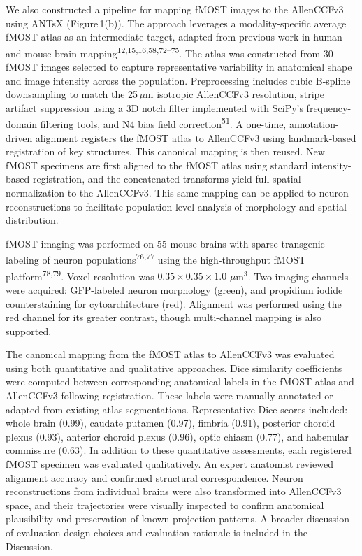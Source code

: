 \documentclass[
  12pt,
]{article}
\begin{document}
We also constructed a pipeline for mapping fMOST images to the
AllenCCFv3 using ANTsX (Figure\,1(b)). The approach leverages a
modality-specific average fMOST atlas as an intermediate target, adapted
from previous work in human and mouse brain
mapping\textsuperscript{12,15,16,58,72--75}. The atlas was constructed
from 30 fMOST images selected to capture representative variability in
anatomical shape and image intensity across the population.
Preprocessing includes cubic B-spline downsampling to match the
25\,\(\mu\)m isotropic AllenCCFv3 resolution, stripe artifact
suppression using a 3D notch filter implemented with SciPy's
frequency-domain filtering tools, and N4 bias field
correction\textsuperscript{51}. A one-time, annotation-driven alignment
registers the fMOST atlas to AllenCCFv3 using landmark-based
registration of key structures. This canonical mapping is then reused.
New fMOST specimens are first aligned to the fMOST atlas using standard
intensity-based registration, and the concatenated transforms yield full
spatial normalization to the AllenCCFv3. This same mapping can be
applied to neuron reconstructions to facilitate population-level
analysis of morphology and spatial distribution.

fMOST imaging was performed on 55 mouse brains with sparse transgenic
labeling of neuron populations\textsuperscript{76,77} using the
high-throughput fMOST platform\textsuperscript{78,79}. Voxel resolution
was \(0.35\times 0.35\times 1.0\) \(\mu\)m\(^3\). Two imaging channels
were acquired: GFP-labeled neuron morphology (green), and propidium
iodide counterstaining for cytoarchitecture (red). Alignment was
performed using the red channel for its greater contrast, though
multi-channel mapping is also supported.

The canonical mapping from the fMOST atlas to AllenCCFv3 was evaluated
using both quantitative and qualitative approaches. Dice similarity
coefficients were computed between corresponding anatomical labels in
the fMOST atlas and AllenCCFv3 following registration. These labels were
manually annotated or adapted from existing atlas segmentations.
Representative Dice scores included: whole brain (0.99), caudate putamen
(0.97), fimbria (0.91), posterior choroid plexus (0.93), anterior
choroid plexus (0.96), optic chiasm (0.77), and habenular commissure
(0.63). In addition to these quantitative assessments, each registered
fMOST specimen was evaluated qualitatively. An expert anatomist reviewed
alignment accuracy and confirmed structural correspondence. Neuron
reconstructions from individual brains were also transformed into
AllenCCFv3 space, and their trajectories were visually inspected to
confirm anatomical plausibility and preservation of known projection
patterns. A broader discussion of evaluation design choices and
evaluation rationale is included in the Discussion.
\end{document}
